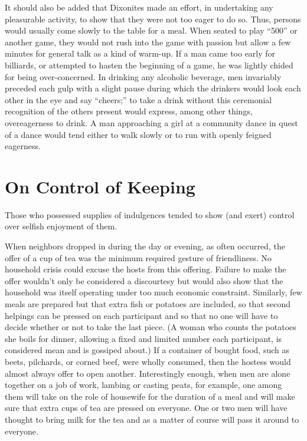 \documentclass[openany,nobib]{tufte-book}
\begin{document}
It should also be added that Dixonites made an effort, in undertaking
any pleasurable activity, to show that they were not too eager to do so.
Thus, persons would usually come slowly to the table for a meal. When
seated to play ``500'' or another game, they would not rush into the
game with passion but allow a few minutes for general talk as a kind of
warm-up. If a man came too early for billiards, or attempted to hasten
the beginning of a game, he was lightly chided for being over-concerned.
In drinking any alcoholic beverage, men invariably preceded each gulp
with a slight pause during which the drinkers would look each other in
the eye and say ``cheers;'' to take a drink without this ceremonial
recognition of the others present would express, among other things,
overeagerness to drink. A man approaching a girl at a community dance in
quest of a dance would tend either to walk slowly or to run with openly
feigned eagerness.

\hypertarget{on-control-of-keeping}{%
\section{On Control of Keeping}\label{on-control-of-keeping}}

Those who possessed supplies of indulgences tended to show (and exert)
control over selfish enjoyment of them.

When neighbors dropped in during the day or evening, as often occurred,
the offer of a cup of tea was the minimum required gesture of
friendliness. No household crisis could excuse the hosts from this
offering. Failure to make the offer wouldn't only be considered a
discourtesy but would also show that the household was itself operating
under too much economic constraint. Similarly, few meals are prepared
but that extra fish or potatoes are included, so that second helpings
can be pressed on each participant and so that no one will have to
decide whether or not to take the last piece. (A woman who counts the
potatoes she boils for dinner, allowing a fixed and limited number each
participant, is considered mean and is gossiped about.) If a container
of bought food, such as beets, pilchards, or corned beef, were wholly
consumed, then the hostess would almost always offer to open another.
Interestingly enough, when men are alone together on a job of work,
lambing or casting peats, for example, one among them will take on the
role of housewife for the duration of a meal and will make sure that
extra cups of tea are pressed on everyone. One or two men will have
thought to bring milk for the tea and as a matter of course will pass it
around to everyone.
\end{document}

